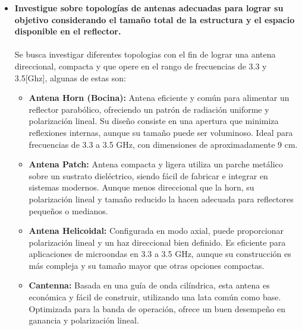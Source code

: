 
\begin{itemize}
	\item \textbf{Investigue sobre topologías de antenas adecuadas para lograr su objetivo considerando el tamaño total de la estructura y el espacio disponible en el reflector.}\\\\
	Se busca investigar diferentes topologias con el fin de lograr una antena direccional, compacta y que opere en el rango de frecuencias de 3.3 y 3.5[Ghz], algunas de estas son:
	\begin{itemize}
		\item \textbf{Antena Horn (Bocina):} Antena eficiente y común para alimentar un reflector parabólico, ofreciendo un patrón de radiación uniforme y polarización lineal. Su diseño consiste en una apertura que minimiza reflexiones internas, aunque su tamaño puede ser voluminoso. Ideal para frecuencias de 3.3 a 3.5 GHz, con dimensiones de aproximadamente 9 cm.
		
		\item \textbf{Antena Patch:} Antena compacta y ligera utiliza un parche metálico sobre un sustrato dieléctrico, siendo fácil de fabricar e integrar en sistemas modernos. Aunque menos direccional que la horn, su polarización lineal y tamaño reducido la hacen adecuada para reflectores pequeños o medianos.
		
		\item \textbf{Antena Helicoidal:} Configurada en modo axial, puede proporcionar polarización lineal y un haz direccional bien definido. Es eficiente para aplicaciones de microondas en 3.3 a 3.5 GHz, aunque su construcción es más compleja y su tamaño mayor que otras opciones compactas.
		
		\item \textbf{Cantenna:} Basada en una guía de onda cilíndrica, esta antena es económica y fácil de construir, utilizando una lata común como base. Optimizada para la banda de operación, ofrece un buen desempeño en ganancia y polarización lineal.
	\end{itemize}
	

\end{itemize}

